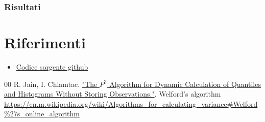\documentclass[conference]{IEEEtran}
\begin{document}
\subsubsection{Risultati}

\section{Riferimenti}
\begin{itemize}
    \item \href{https://github.com/matteo-conti-97/hard_disk_failure_data_stream_processing}{Codice sorgente github}
\end{itemize}
\begin{thebibliography}{00}
     R. Jain, I. Chlamtac. \href{https://www.cse.wustl.edu/~jain/papers/ftp/psqr.pdf}{"The $P^2$ Algorithm for Dynamic Calculation of Quantiles and Histograms Without Storing Observations."}.
     Welford's algorithm \url{https://en.m.wikipedia.org/wiki/Algorithms_for_calculating_variance\#Welford%27s_online_algorithm}
\end{thebibliography}
\vspace{12pt}
\end{document}
